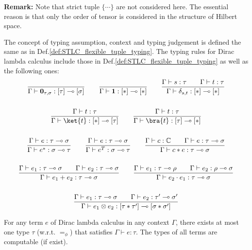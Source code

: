 \textbf{Remark: } Note that strict tuple $\{\cdots\}$ are not considered here. The essential reason is that only the order of tensor is considered in the structure of Hilbert space.

\begin{definition}
  The concept of typing assumption, context and typing judgement is defined the same as in Def.\ref{def:STLC_flexible_tuple_typing}. The typing rules for Dirac lambda calculus include those in Def.\ref{def:STLC_flexible_tuple_typing} as well as the following ones:
  \begin{gather*}
    \frac{}{\Gamma \vdash \mathbf{0}_{\tau, \sigma} : [\tau] \multimap [\sigma]}
    \qquad
    \frac{}{\Gamma \vdash \mathbf{1} : [*] \multimap [*]}
    \qquad
    \frac{\Gamma \vdash s : \tau \qquad \Gamma \vdash t : \tau}{\Gamma \vdash \delta_{s, t} : [*] \multimap [*]}\\
    \ \\
    \frac{\Gamma \vdash t : \tau}{\Gamma \vdash \ket{t} : [*] \multimap [\tau]}
    \qquad 
    \frac{\Gamma \vdash t : \tau}{\Gamma \vdash \bra{t} : [\tau] \multimap [*]}\\
    \ \\
    \frac{\Gamma \vdash e : \tau \multimap \sigma}{\Gamma \vdash e^* : \sigma \multimap \tau}
    \qquad
    \frac{\Gamma \vdash e : \tau \multimap \sigma}{\Gamma \vdash e^T : \sigma \multimap \tau}
    \qquad
    \frac{\Gamma \vdash c : \mathbb{C}\qquad \Gamma \vdash e : \tau \multimap \sigma}{\Gamma \vdash c * e : \tau \multimap \sigma}\\
    \ \\
    \frac{\Gamma \vdash e_1 : \tau \multimap \sigma \qquad \Gamma \vdash e_2 : \tau \multimap \sigma }{\Gamma \vdash e_1 + e_2 : \tau \multimap \sigma }
    \qquad 
    \frac{\Gamma \vdash e_1 : \tau \multimap \rho\qquad \Gamma \vdash e_2 : \rho \multimap \sigma}{\Gamma \vdash e_2 \cdot e_1 : \tau \multimap \sigma}\\
    \ \\
    \frac{\Gamma \vdash e_1 : \tau \multimap \sigma \qquad \Gamma \vdash e_2 : \tau' \multimap \sigma'}{\Gamma \vdash e_1 \otimes e_2 : [\tau * \tau'] \multimap [\sigma * \sigma']}
  \end{gather*}
  
\end{definition}

\begin{claim}
  For any term $e$ of Dirac lambda calculus in any context $\Gamma$, there exists at most one type $\tau$ (w.r.t. $=_\phi$) that satisfies $\Gamma \vdash e : \tau$. The types of all terms are computable (if exist).
\end{claim}

